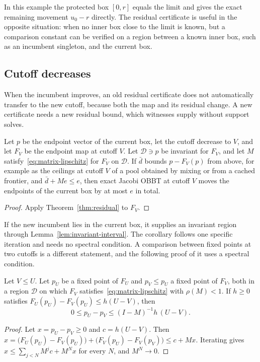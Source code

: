 In this example the protected box $[0,r]$ equals the limit and gives the
exact remaining movement $u_0-r$ directly. The residual certificate is
useful in the opposite situation: when no inner box close to the limit is
known, but a comparison constant can be verified on a region between a
known inner box, such as an incumbent singleton, and the current box.

\subsection{Cutoff decreases}\label{sec:residual-cutoff}

When the incumbent improves, an old residual certificate does not
automatically transfer to the new cutoff, because both the map and its
residual change. A new certificate needs a new residual bound, which
witnesses supply without support solves.

\begin{corollary}\label{cor:cutoff-tail}
Let $p$ be the endpoint vector of the current box, let the cutoff
decrease to $V$, and let $F_V$ be the endpoint map at cutoff $V$. Let
$\mathcal D\ni p$ be invariant for $F_V$, and let $M$
satisfy~\eqref{eq:matrix-lipschitz} for $F_V$ on $\mathcal D$. If $\bar d$
bounds $p-F_V(p)$ from above, for example as the ceilings at cutoff $V$
of a pool obtained by mixing or from a cached frontier, and $\bar d+Me\le
e$, then exact Jacobi OBBT at cutoff $V$ moves the endpoints of the
current box by at most $e$ in total.
\end{corollary}
\begin{proof}
Apply Theorem~\ref{thm:residual} to $F_V$.
\end{proof}

If the new incumbent lies in the current box, it supplies an invariant
region through Lemma~\ref{lem:invariant-interval}. The corollary follows
one specific iteration and needs no spectral condition. A comparison
between fixed points at two cutoffs is a different statement, and the
following proof of it uses a spectral condition.

\begin{proposition}\label{prop:fixed-point-shift}
Let $V\le U$. Let $p_U$ be a fixed point of $F_U$ and $p_V\le p_U$ a
fixed point of $F_V$, both in a region $\mathcal D$ on which $F_V$
satisfies~\eqref{eq:matrix-lipschitz} with $\rho(M)<1$. If $h\ge0$
satisfies $F_U(p_U)-F_V(p_U)\le h(U-V)$, then
\[
 0\le p_U-p_V\le(I-M)^{-1}h\,(U-V).
\]
\end{proposition}
\begin{proof}
Let $x=p_U-p_V\ge0$ and $c=h(U-V)$. Then
$x=\bigl(F_U(p_U)-F_V(p_U)\bigr)+\bigl(F_V(p_U)-F_V(p_V)\bigr)\le c+Mx$.
Iterating gives $x\le\sum_{j<N}M^jc+M^Nx$ for every $N$, and $M^N\to0$.
\end{proof}


